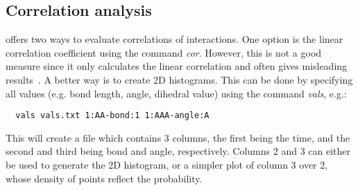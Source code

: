 \subsection{Correlation analysis}
 offers two ways to evaluate correlations of interactions. One option is the linear correlation coefficient using the command \textit{cor}. However, this is not a good measure since it only calculates the linear correlation and often gives misleading results~\cite{Ruehle:2009.a}. A better way is to create 2D histograms. This can be done by specifying all values (e.g. bond length, angle, dihedral value) using the command \textit{vals}, e.g.:
\begin{verbatim}
  vals vals.txt 1:AA-bond:1 1:AAA-angle:A
\end{verbatim}
This will create a file which contains 3 columns, the first being the time, and the second and third being bond and angle, respectively. Columns 2 and 3 can either be used to generate the 2D histogram, or a simpler plot of column 3 over 2, whose density of points reflect the probability.
